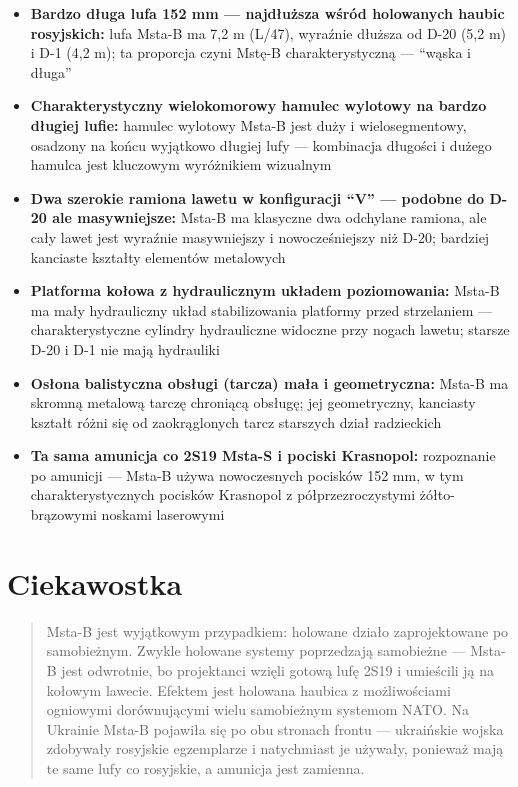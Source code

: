 \documentclass[12pt,openany,oneside]{book}
\providecommand{\tightlist}{%
  \setlength{\itemsep}{0pt}\setlength{\parskip}{0pt}}
\begin{document}
\begin{itemize}
\tightlist
\item
  \textbf{Bardzo długa lufa 152 mm --- najdłuższa wśród holowanych
  haubic rosyjskich:} lufa Msta-B ma 7,2 m (L/47), wyraźnie dłuższa od
  D-20 (5,2 m) i D-1 (4,2 m); ta proporcja czyni Mstę-B
  charakterystyczną --- ``wąska i długa''
\item
  \textbf{Charakterystyczny wielokomorowy hamulec wylotowy na bardzo
  długiej lufie:} hamulec wylotowy Msta-B jest duży i wielosegmentowy,
  osadzony na końcu wyjątkowo długiej lufy --- kombinacja długości i
  dużego hamulca jest kluczowym wyróżnikiem wizualnym
\item
  \textbf{Dwa szerokie ramiona lawetu w konfiguracji ``V'' --- podobne
  do D-20 ale masywniejsze:} Msta-B ma klasyczne dwa odchylane ramiona,
  ale cały lawet jest wyraźnie masywniejszy i nowocześ­niejszy niż D-20;
  bardziej kanciaste kształty elementów metalowych
\item
  \textbf{Platforma kołowa z hydraulicznym układem poziomowania:} Msta-B
  ma mały hydrauliczny układ stabilizowania platformy przed strzelaniem
  --- charakterystyczne cylindry hydrauliczne widoczne przy nogach
  lawetu; starsze D-20 i D-1 nie mają hydrauliki
\item
  \textbf{Osłona balistyczna obsługi (tarcza) mała i geometryczna:}
  Msta-B ma skromną metalową tarczę chroniącą obsługę; jej geometryczny,
  kanciasty kształt różni się od zaokrąglonych tarcz starszych dział
  radzieckich
\item
  \textbf{Ta sama amunicja co 2S19 Msta-S i pociski Krasnopol:}
  rozpoznanie po amunicji --- Msta-B używa nowoczesnych pocisków 152 mm,
  w tym charakterystycznych pocisków Krasnopol z półprzezroczystymi
  żółto-brązowymi noskami laserowymi
\end{itemize}

\section{Ciekawostka}\label{ciekawostka-21}

\begin{quote}
Msta-B jest wyjątkowym przypadkiem: holowane działo zaprojektowane po
samobieżnym. Zwykle holowane systemy poprzedzają samobieżne --- Msta-B
jest odwrotnie, bo projektanci wzięli gotową lufę 2S19 i umieścili ją na
kołowym lawecie. Efektem jest holowana haubica z możliwościami ogniowymi
dorównującymi wielu samobieżnym systemom NATO. Na Ukrainie Msta-B
pojawiła się po obu stronach frontu --- ukraińskie wojska zdobywały
rosyjskie egzemplarze i natychmiast je używały, ponieważ mają te same
lufy co rosyjskie, a amunicja jest zamienna.
\end{quote}
\end{document}
